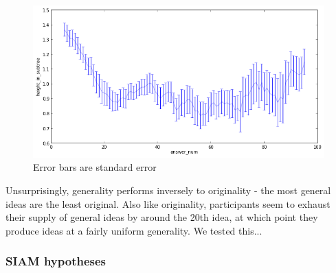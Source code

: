 \begin{figure}[h]
    \centering
    \includegraphics[width=0.9\columnwidth]{run_height_in_subtree}
    \caption{Error bars are standard error}
\end{figure}

Unsurprisingly, generality performs inversely to originality - the most general ideas are the least original. Also like originality, participants seem to exhaust their supply of general ideas by around the 20th idea, at which point they produce ideas at a fairly uniform generality. We tested this...

\subsubsection{SIAM hypotheses}

\cite{nijstad_how_2006}